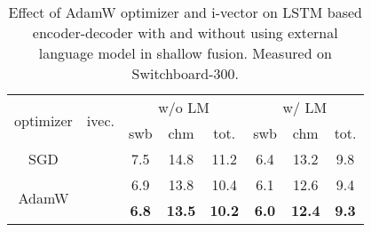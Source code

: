 \documentclass[a4paper]{article}
\begin{document}
\begin{table}
  \eightpt
  \centering
  \caption{Effect of AdamW optimizer and i-vector on LSTM based encoder-decoder with and without using external language model in shallow fusion. Measured on Switchboard-300.}
  \vspace{-3.5mm}
  \begin{tabular}{|@{}c@{}|@{}c@{}||c|c|c||c|c|c|}
    \hline
\multirow{2}{*}{\hspace{1mm}optimizer\hspace{1mm}} & \multirow{2}{*}{\hspace{1mm}ivec.\hspace{1mm}}     & \multicolumn{3}{c||}{w/o LM} & \multicolumn{3}{|c|}{w/ LM} \\
\cline{3-8}
                           &                            &  swb & chm & tot. & swb & chm & tot. \\
\hline            
\hline            
              SGD       &                               &  7.5 & 14.8 & 11.2 & 6.4 & 13.2 & 9.8  \\ \cline{1-1}\cline{3-8}
\multirow{2}{*}{AdamW}  &                               &  6.9 & 13.8 & 10.4 & 6.1 & 12.6 & 9.4  \\ \cline{2-8}
                        & \multirow{1}{*}{} &  \bf{6.8} & \bf{13.5} & \bf{10.2} & \bf{6.0} & \bf{12.4} & \bf{9.3}  \\
\hline
\end{tabular}                              
\label{tab:lstm_adamw_ivec}
\vspace{-2mm}
\end{table}
\end{document}
